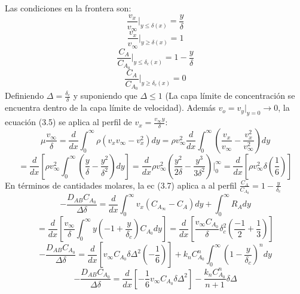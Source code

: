 \documentclass{article}
\begin{document}
Las condiciones en la frontera son:
\begin{equation*}
    \frac{v_x}{v_\infty}|_{y\leq\delta (x)}=\frac{y}{\delta}
\end{equation*}
  \begin{equation}
      \frac{v_x}{v_\infty}|_{y\geq\delta (x)}=1
  \end{equation}
\begin{equation*}
    \frac{C_A}{C_{A_0}}|_{y\leq\delta_c(x)}=1-\frac{y}{\delta}
\end{equation*}
\begin{equation}
    \frac{C_A}{C_{A_0}}|_{y\geq\delta_c(x)}=0
\end{equation}
Definiendo $\Delta=\frac{\delta_c}{\delta}$ y suponiendo que $\Delta\leq1$ (La capa límite de concentración se encuentra dentro de la capa límite de velocidad). Además $v_o=v_y|_{y=0}\rightarrow 0$, la ecuación (3.5) se aplica al perfil de $v_x=\frac{v_\infty y}{\delta}$:
\begin{equation*}
    \mu\frac{v_\infty}{\delta}=\frac{d}{dx}\int_0^\infty \rho (v_xv_\infty-v_x^2)dy=\rho v_\infty^2 \frac{d}{dx}\int_0^\infty (\frac{v_x}{v_\infty}-\frac{v_x^2}{v_\infty^2})dy
\end{equation*}
\begin{equation}
    =\frac{d}{dx}[\rho v_\infty^2\int_0^\infty(\frac{y}{\delta}-\frac{y^2}{\delta ^2})dy]=\frac{d}{dx}\rho v_\infty^2 (\frac{y^2}{2\delta}-\frac{y^3}{3\delta ^2})|_0^\infty=\frac{d}{dx}[\rho v_\infty ^2 \delta (\frac{1}{6})]
\end{equation}
 En términos de cantidades molares, la ec (3.7) aplica a al perfil $\frac{C_A}{C_{A_0}}=1-\frac{y}{\delta_c}$   
 \begin{equation*}
     -\frac{D_{AB}C_{A_0}}{\Delta \delta}=\frac{d}{dx}\int_0^\infty v_x(C_{A_\infty}-C_A)dy+\int_0^\infty R_A dy
 \end{equation*}
\begin{equation*}
    =\frac{d}{dx}[\frac{v_\infty}{\delta}\int_0^\infty y(-1+\frac{y}{\delta _c})C_{A_0}dy]=\frac{d}{dx}[\frac{v_\infty C_{A_0}}{\delta}\delta_c^2(\frac{-1}{2}+\frac{1}{3})]
\end{equation*}
\begin{equation*}
    -\frac{D_{AB}C_{A_0}}{\Delta \delta}=\frac{d}{dx}[v_\infty C_{A_0}\delta \Delta^2(-\frac{1}{6})]+k_nC_{A_0}^n \int_0^\infty (1-\frac{y}{\delta_c})^ndy
\end{equation*}
\begin{equation}
    -\frac{D_{AB}C_{A_0}}{\Delta \delta}=\frac{d}{dx}[-\frac{1}{6}v_\infty C_{A_0}\delta \Delta^2]-\frac{k_nC_{A_0}^n}{n+1}\delta \Delta
\end{equation}
\end{document}
